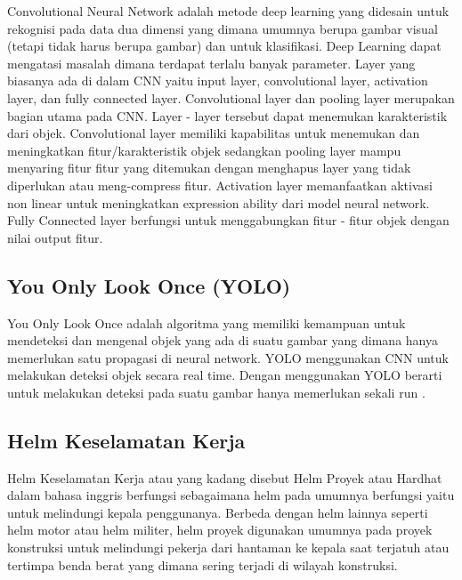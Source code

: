 Convolutional Neural Network adalah metode deep learning yang didesain untuk rekognisi pada data dua dimensi yang dimana umumnya berupa gambar visual (tetapi tidak harus berupa gambar) dan untuk klasifikasi. Deep Learning dapat mengatasi masalah dimana terdapat terlalu banyak parameter.  Layer yang biasanya ada di dalam CNN yaitu input layer, convolutional layer, activation layer, dan fully connected layer.
Convolutional layer dan pooling layer merupakan bagian utama pada CNN. Layer - layer tersebut dapat menemukan karakteristik dari objek. Convolutional layer memiliki kapabilitas untuk menemukan dan meningkatkan fitur/karakteristik objek sedangkan pooling layer mampu menyaring fitur fitur yang ditemukan dengan menghapus layer yang tidak diperlukan atau meng-compress fitur. Activation layer memanfaatkan aktivasi non linear untuk meningkatkan expression ability dari model neural network. Fully Connected layer berfungsi untuk menggabungkan fitur - fitur objek dengan nilai output fitur. \cite{Goodfellow-et-al-2016}

\subsection{You Only Look Once (YOLO)}
\label{sec:youonlylookone}

You Only Look Once adalah algoritma yang memiliki kemampuan untuk mendeteksi dan mengenal 
objek yang ada di suatu gambar yang dimana hanya memerlukan satu propagasi di neural network. 
YOLO menggunakan CNN untuk melakukan deteksi objek secara real time. 
Dengan menggunakan YOLO berarti untuk melakukan deteksi pada suatu gambar hanya memerlukan 
sekali run .\cite{adiwibowo2020deteksi}


\subsection{Helm Keselamatan Kerja}
\label{sec:helmkeselamatankerja}

Helm Keselamatan Kerja atau yang kadang disebut Helm Proyek atau Hardhat  dalam bahasa inggris berfungsi sebagaimana helm pada umumnya berfungsi yaitu untuk melindungi kepala penggunanya. Berbeda dengan helm lainnya seperti helm motor atau helm militer, helm proyek digunakan umumnya pada proyek konstruksi untuk melindungi pekerja dari hantaman ke kepala saat terjatuh atau tertimpa benda berat yang dimana sering terjadi di wilayah konstruksi. \cite{safeopedia_2018}